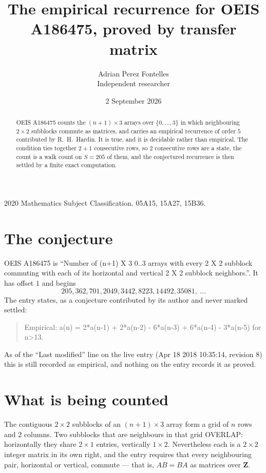 \documentclass[11pt,a4paper]{article}
\title{The empirical recurrence for OEIS A186475, proved by transfer matrix}
\author{Adrian Perez Fontelles\\ \small Independent researcher}
\date{2 September 2026}
\theoremstyle{plain}
\theoremstyle{definition}
\begin{document}
\maketitle

\begin{abstract}
OEIS A186475 counts the $(n+1)\times3$ arrays over $\{0,\dots,3\}$ in which
neighbouring $2\times2$ subblocks commute as matrices, and carries an empirical recurrence
of order $5$ contributed by R.~H.~Hardin. It is true, and it is decidable rather than
empirical. The condition ties together $2+1$ consecutive rows, so $2$ consecutive rows are
a state, the count is a walk count on $S=205$ of them, and the conjectured recurrence is then
settled by a finite exact computation.
\end{abstract}

\noindent\small 2020 Mathematics Subject Classification. 05A15, 15A27, 15B36.\normalsize

\section{The conjecture}

OEIS A186475 is ``Number of (n+1) X 3 0..3 arrays with every 2 X 2 subblock commuting with each of its horizontal and vertical 2 X 2 subblock neighbors.''. It has offset $1$ and begins
\[
205, 362, 701, 2049, 3442, 8223, 14492, 35081,\ \dots
\]
The entry states, as a conjecture contributed by its author and never marked settled:
\begin{quote}
Empirical: a(n) = 2*a(n-1) + 2*a(n-2) - 6*a(n-3) + 6*a(n-4) - 3*a(n-5) for n>13.
\end{quote}
As of the ``Last modified'' line on the live entry (Apr 18 2018 10:35:14, revision 8) this is still
recorded as empirical, and nothing on the entry records it as proved.

\section{What is being counted}

The contiguous $2\times2$ subblocks of an $(n+1)\times3$ array form a grid of $n$
rows and $2$ columns. Two subblocks that are neighbours in that
grid OVERLAP: horizontally they share $2\times1$ entries, vertically
$1\times2$. Nevertheless each is a $2\times2$ integer matrix in its own right, and
the entry requires that every neighbouring pair, horizontal or vertical, commute --- that is,
$AB=BA$ as matrices over $\mathbf{Z}$.
\end{document}
